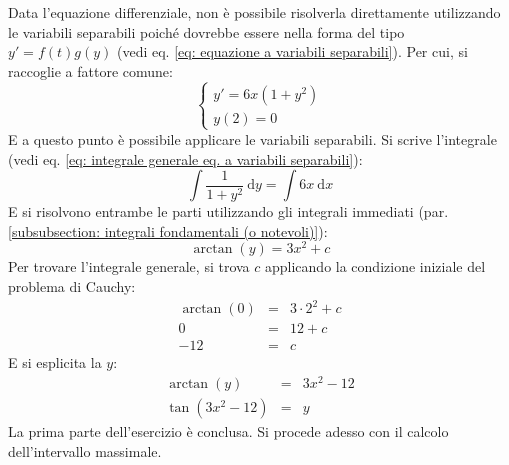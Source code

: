 \documentclass[a4paper]{article}
\begin{document}
	\noindent
	Data l'equazione differenziale, non è possibile risolverla direttamente utilizzando le variabili separabili poiché dovrebbe essere nella forma del tipo $y' = f\left(t\right) g\left(y\right)$ (vedi eq. \ref{eq: equazione a variabili separabili}). Per cui, si raccoglie a fattore comune:
	\begin{equation*}
		\begin{cases}
			y'=6x\left(1+y^{2}\right) \\
			y\left(2\right) = 0
		\end{cases}
	\end{equation*}
	E a questo punto è possibile applicare le variabili separabili. Si scrive l'integrale (vedi eq. \ref{eq: integrale generale eq. a variabili separabili}):
	\begin{equation*}
		\displaystyle \int \dfrac{1}{1+y^{2}} \:\mathrm{d}y = \int 6x \:\mathrm{d}x
	\end{equation*}
	E si risolvono entrambe le parti utilizzando gli integrali immediati (par. \ref{subsubsection: integrali fondamentali (o notevoli)}):
	\begin{equation*}
		\arctan\left(y\right) = 3x^{2} + c
	\end{equation*}
	Per trovare l'integrale generale, si trova $c$ applicando la condizione iniziale del problema di Cauchy:
	\begin{equation*}
		\begin{array}{rcl}
			\arctan\left(0\right) &=& 3 \cdot 2^{2} + c \\
			0 &=& 12 + c \\
			-12 &=& c
		\end{array}
	\end{equation*}
	E si esplicita la $y$:
	\begin{equation*}
		\begin{array}{rcl}
			\arctan\left(y\right) &=& 3x^{2} -12 \\ [.3em]
			\tan\left(3x^{2} - 12\right) &=& y
		\end{array}
	\end{equation*}
	La prima parte dell'esercizio è conclusa. Si procede adesso con il calcolo dell'intervallo massimale.\newline
\end{document}
